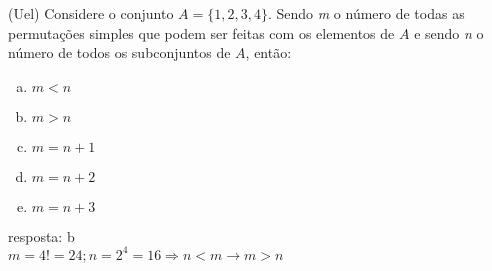 \begin{ex}
  (Uel) Considere o conjunto $A= \{1, 2, 3, 4 \}$. Sendo \textit{m} o número de todas as permutações simples que podem ser feitas com os elementos de $A$ e sendo \textit{n} o número de todos os subconjuntos de $A$, então:
    \begin{enumerate}[(a)]
    \item $m < n$
    \item $m > n$
    \item $m = n + 1$
    \item $m = n + 2$
    \item $m = n + 3$
    \end{enumerate}
     \begin{sol}
       resposta: b \\
       $m=4!=24; n=2^4=16 \Longrightarrow n<m \rightarrow m>n$
     \end{sol}
\end{ex}